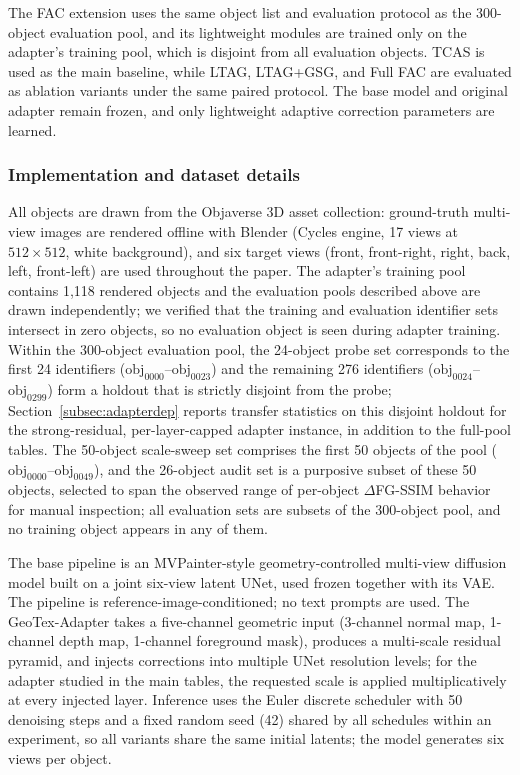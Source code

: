 \documentclass[times,twocolumn,final]{elsarticle}
\begin{document}
The FAC extension uses the same object list and evaluation protocol as the 300-object evaluation pool, and its lightweight modules are trained only on the adapter's training pool, which is disjoint from all evaluation objects. TCAS is used as the main baseline, while LTAG, LTAG+GSG, and Full FAC are evaluated as ablation variants under the same paired protocol. The base model and original adapter remain frozen, and only lightweight adaptive correction parameters are learned.

\subsubsection{Implementation and dataset details}

All objects are drawn from the Objaverse 3D asset collection: ground-truth multi-view images are rendered offline with Blender (Cycles engine, 17 views at $512\times512$, white background), and six target views (front, front-right, right, back, left, front-left) are used throughout the paper. The adapter's training pool contains 1{,}118 rendered objects and the evaluation pools described above are drawn independently; we verified that the training and evaluation identifier sets intersect in zero objects, so no evaluation object is seen during adapter training. Within the 300-object evaluation pool, the 24-object probe set corresponds to the first 24 identifiers ($\mathrm{obj}_{0000}$--$\mathrm{obj}_{0023}$) and the remaining 276 identifiers ($\mathrm{obj}_{0024}$--$\mathrm{obj}_{0299}$) form a holdout that is strictly disjoint from the probe; Section~\ref{subsec:adapterdep} reports transfer statistics on this disjoint holdout for the strong-residual, per-layer-capped adapter instance, in addition to the full-pool tables. The 50-object scale-sweep set comprises the first 50 objects of the pool ($\mathrm{obj}_{0000}$--$\mathrm{obj}_{0049}$), and the 26-object audit set is a purposive subset of these 50 objects, selected to span the observed range of per-object $\Delta$FG-SSIM behavior for manual inspection; all evaluation sets are subsets of the 300-object pool, and no training object appears in any of them.

The base pipeline is an MVPainter-style geometry-controlled multi-view diffusion model built on a joint six-view latent UNet, used frozen together with its VAE. The pipeline is reference-image-conditioned; no text prompts are used. The GeoTex-Adapter takes a five-channel geometric input (3-channel normal map, 1-channel depth map, 1-channel foreground mask), produces a multi-scale residual pyramid, and injects corrections into multiple UNet resolution levels; for the adapter studied in the main tables, the requested scale is applied multiplicatively at every injected layer. Inference uses the Euler discrete scheduler with 50 denoising steps and a fixed random seed (42) shared by all schedules within an experiment, so all variants share the same initial latents; the model generates six views per object.
\end{document}
